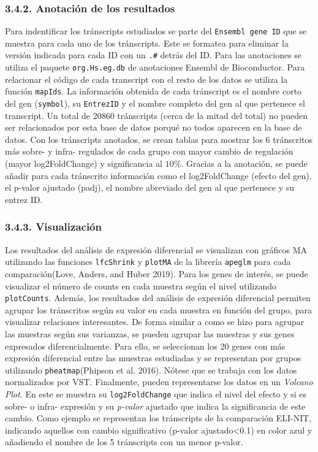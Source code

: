\documentclass[
]{article}
\begin{document}
\hypertarget{anotaciuxf3n-de-los-resultados}{%
\subsubsection{3.4.2. Anotación de los
resultados}\label{anotaciuxf3n-de-los-resultados}}

Para indentificar los tránscripts estudiados se parte del
\texttt{Ensembl\ gene\ ID} que se muestra para cada uno de los
tránscripts. Este se formatea para eliminar la versión indicada para
cada ID con un \texttt{.\#} detrás del ID. Para las anotaciones se
utiliza el paquete \texttt{org.Hs.eg.db} de anotaciones Ensembl de
Bioconductor. Para relacionar el código de cada transcript con el resto
de los datos se utiliza la función \texttt{mapIds}. La información
obtenida de cada tránscript es el nombre corto del gen
(\texttt{symbol}), su \texttt{EntrezID} y el nombre completo del gen al
que pertenece el transcript. Un total de 20860 tránscripts (cerca de la
mitad del total) no pueden ser relacionados por esta base de datos
porqué no todos aparecen en la base de datos. Con los tránscripts
anotados, se crean tablas para mostrar los 6 tránscritos más sobre- y
infra- regulados de cada grupo con mayor cambio de regulación (mayor
log2FoldChange) y significancia al \(10\%\). Gracias a la anotación, se
puede añadir para cada tránscrito información como el log2FoldChange
(efecto del gen), el p-valor ajustado (padj), el nombre abreviado del
gen al que pertenece y su entrez ID.

\hypertarget{visualizaciuxf3n}{%
\subsubsection{3.4.3. Visualización}\label{visualizaciuxf3n}}

Los resultados del análisis de expresión diferencial se visualizan con
gráficos MA utilizando las funciones \texttt{lfcShrink} y
\texttt{plotMA} de la librería \texttt{apeglm} para cada
comparación(Love, Anders, and Huber 2019). Para los genes de interés, se
puede visualizar el número de counts en cada muestra según el nivel
utilizando \texttt{plotCounts}. Además, los resultados del análisis de
expresión diferencial permiten agrupar los tránscritos según su valor en
cada muestra en función del grupo, para visualizar relaciones
interesantes. De forma similar a como se hizo para agrupar las muestras
según sus varianzas, se pueden agrupar las muestras y sus genes
expresados diferencialmente. Para ello, se seleccionan los 20 genes con
más expresión diferencial entre las muestras estudiadas y se representan
por grupos utilizando \texttt{pheatmap}(Phipson et al. 2016). Nótese que
se trabaja con los datos normalizados por VST. Finalmente, pueden
representarse los datos en un \emph{Volcano Plot}. En este se muestra su
\texttt{log2FoldChange} que indica el nivel del efecto y si es sobre- o
infra- expresión y su \emph{p-valor} ajustado que indica la
significancia de este cambio. Como ejemplo se representan los
tránscripts de la comparación ELI-NIT, indicando aquellos con cambio
significativo (p-valor ajustado\textless0.1) en color azul y añadiendo
el nombre de los 5 tránscripts con un menor p-valor.
\end{document}
